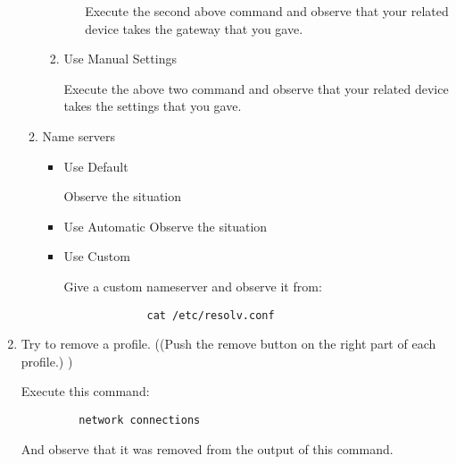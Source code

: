 \documentclass[a4paper,10pt]{article}
\begin{document}
\begin{enumerate}
\begin{enumerate}
\begin{enumerate}
\begin{itemize}
		      Execute the second above command and observe that your related device takes the gateway that you gave.
		\end{itemize}
	      \item Use Manual Settings
		    
		      Execute the above two command and observe that your related device takes the settings that you gave. 
	    \end{enumerate}
	  \item Name servers
	    \begin{itemize}
		 \item Use Default
		 
		  Observe the situation
		 \item Use Automatic
		  Observe the situation
	  
		 \item Use Custom

		  Give a custom nameserver and observe it from:
		   \begin{verbatim}
		     cat /etc/resolv.conf
		  \end{verbatim}
	     \end{itemize}
   
	  
	
      \end{enumerate}
      \item Try to remove a profile. ((Push the remove button on the right part of each profile.) )
      
	    Execute this command:
	    \begin{verbatim}
	     network connections
	    \end{verbatim}
	    And observe that it was removed from the output of this command.

\end{enumerate}
\end{document}
